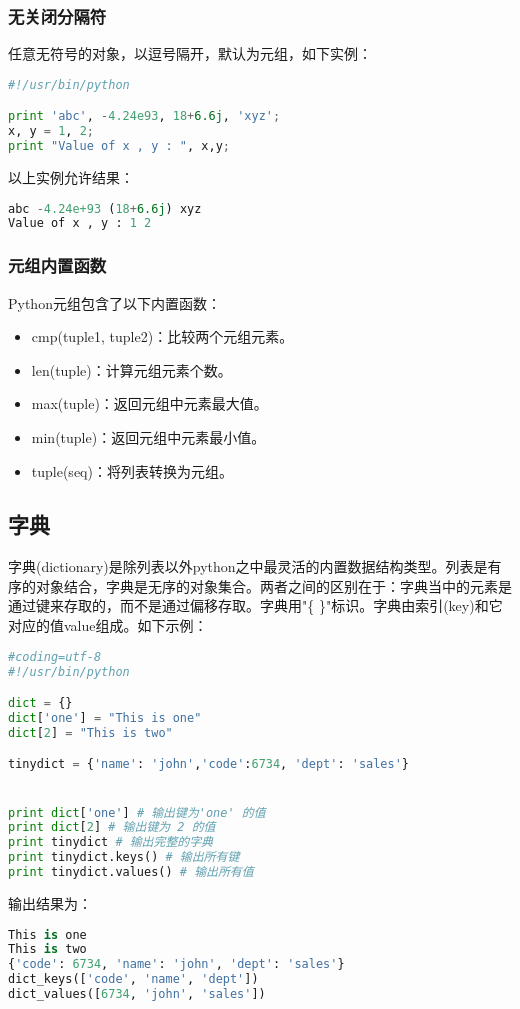 \subsubsection{无关闭分隔符}
任意无符号的对象，以逗号隔开，默认为元组，如下实例：
\begin{lstlisting}[language=Python]
#!/usr/bin/python

print 'abc', -4.24e93, 18+6.6j, 'xyz';
x, y = 1, 2;
print "Value of x , y : ", x,y;
\end{lstlisting}
以上实例允许结果：
\begin{lstlisting}[language=Python]
abc -4.24e+93 (18+6.6j) xyz
Value of x , y : 1 2
\end{lstlisting}


\subsubsection{元组内置函数}
Python元组包含了以下内置函数：
\begin{itemize}
\item 	cmp(tuple1, tuple2)：比较两个元组元素。
\item	len(tuple)：计算元组元素个数。
\item	max(tuple)：返回元组中元素最大值。
\item	min(tuple)：返回元组中元素最小值。
\item	tuple(seq)：将列表转换为元组。
\end{itemize}


\subsection{字典}
字典(dictionary)是除列表以外python之中最灵活的内置数据结构类型。列表是有序的对象结合，字典是无序的对象集合。两者之间的区别在于：字典当中的元素是通过键来存取的，而不是通过偏移存取。字典用"\{ \}"标识。字典由索引(key)和它对应的值value组成。如下示例：
\begin{lstlisting}[language=Python]
#coding=utf-8
#!/usr/bin/python

dict = {}
dict['one'] = "This is one"
dict[2] = "This is two"

tinydict = {'name': 'john','code':6734, 'dept': 'sales'}


print dict['one'] # 输出键为'one' 的值
print dict[2] # 输出键为 2 的值
print tinydict # 输出完整的字典
print tinydict.keys() # 输出所有键
print tinydict.values() # 输出所有值
\end{lstlisting}
输出结果为：
\begin{lstlisting}[language=Python]
This is one
This is two
{'code': 6734, 'name': 'john', 'dept': 'sales'}
dict_keys(['code', 'name', 'dept'])
dict_values([6734, 'john', 'sales'])
\end{lstlisting}


